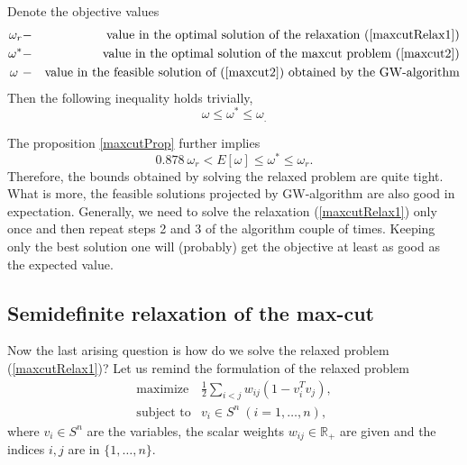 \documentclass[12pt]{book}
\theoremstyle{definition}
\begin{document}
\rem Denote the objective values 
\begin{eqnarray*}
\omega_r &-& \mbox{value in the optimal solution of the relaxation (\ref{maxcutRelax1})} \\
\omega^* &-& \mbox{value in the optimal solution of the maxcut problem (\ref{maxcut2})} \\
\omega \  &-& \mbox{value in the feasible solution of (\ref{maxcut2}) obtained by the GW-algorithm} 
\end{eqnarray*}
Then the following inequality holds trivially, %
\begin{equation}
\omega \leq \omega^*\leq \omega_.
\end{equation}

The proposition \ref{maxcutProp} further implies  
\begin{equation}
0.878 \ \omega_r < E[\omega] \leq \omega^*\leq \omega_r.
\end{equation}
Therefore, the bounds obtained by solving the relaxed problem are quite tight. What is more, the feasible solutions projected by GW-algorithm are also good in expectation. Generally, we need to solve the relaxation (\ref{maxcutRelax1}) only once and then repeat steps 2 and 3 of the algorithm couple of times. 
Keeping only the best solution one will (probably) get the objective at least as good as the expected value.


\subsection{Semidefinite relaxation of the max-cut}

Now the last arising question is how do we solve the relaxed problem (\ref{maxcutRelax1})? 
Let us remind the formulation of the relaxed problem
\begin{equation}
\begin{array}{ll}
\mbox{maximize} & \frac{1}{2}\sum_{i<j}w_{ij}(1-v_i^Tv_j ), \\
\mbox{subject to} &  v_i \in S^n \ (i = 1,\dots ,n),
\end{array}
\end{equation}
where $v_i\in S^n$ are the variables, the scalar weights $w_{ij}\in \mathbb{R}_+$ are given
and the indices $i,j$ are in $\{1,\dots ,n\}$.
\end{document}
